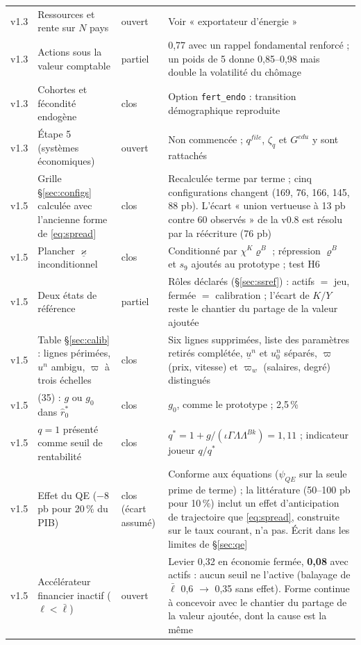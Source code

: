 \documentclass[11pt,a4paper]{article}
\begin{document}
\begin{center}
\begin{longtable}{p{0.9cm}p{4.6cm}p{1.3cm}p{7.6cm}}
v1.3 & Ressources et rente sur $N$ pays & ouvert & Voir « exportateur d'énergie »\\
v1.3 & Actions sous la valeur comptable & partiel & 0,77 avec un rappel fondamental renforcé ; un poids de 5 donne 0,85--0,98 mais double la volatilité du chômage\\
v1.3 & Cohortes et fécondité endogène & clos & Option \texttt{fert\_endo} : transition démographique reproduite\\
v1.3 & Étape 5 (systèmes économiques) & ouvert & Non commencée ; $q^{file}$, $\zeta_q$ et $G^{edu}$ y sont rattachés\\
v1.5 & Grille \S\ref{sec:configs} calculée avec l'ancienne forme de \eqref{eq:spread} & clos & Recalculée terme par terme ; cinq configurations changent (169, 76, 166, 145, 88 pb). L'écart « union vertueuse à 13 pb contre 60 observés » de la v0.8 est résolu par la réécriture (76 pb)\\
v1.5 & Plancher $\underline\varkappa$ inconditionnel & clos & Conditionné par $\chi^K\varrho^B$ ; répression $\varrho^B$ et $s_9$ ajoutés au prototype ; test H6\\
v1.5 & Deux états de référence & partiel & Rôles déclarés (\S\ref{sec:ssref}) : actifs $=$ jeu, fermée $=$ calibration ; l'écart de $K/Y$ reste le chantier du partage de la valeur ajoutée\\
v1.5 & Table \S\ref{sec:calib} : lignes périmées, $u^n$ ambigu, $\varpi$ à trois échelles & clos & Six lignes supprimées, liste des paramètres retirés complétée, $\underline u^n$ et $u^n_0$ séparés, $\varpi$ (prix, vitesse) et $\varpi_w$ (salaires, degré) distingués\\
v1.5 & (35) : $g$ ou $g_0$ dans $\hat r^\ast_0$ & clos & $g_0$, comme le prototype ; 2,5\,\%\\
v1.5 & $q=1$ présenté comme seuil de rentabilité & clos & $q^\ast=1+g/(\iota\Gamma\Lambda\Lambda^{Bk})=1{,}11$ ; indicateur joueur $q/q^\ast$\\
v1.5 & Effet du QE ($-8$ pb pour 20\,\% du PIB) & clos (écart assumé) & Conforme aux équations ($\psi_{QE}$ sur la seule prime de terme) ; la littérature (50--100 pb pour 10\,\%) inclut un effet d'anticipation de trajectoire que \eqref{eq:spread}, construite sur le taux courant, n'a pas. Écrit dans les limites de \S\ref{sec:qe}\\
v1.5 & Accélérateur financier inactif ($\ell<\bar\ell$) & ouvert & Levier 0,32 en économie fermée, \textbf{0,08} avec actifs : aucun seuil ne l'active (balayage de $\bar\ell$ 0,6 $\to$ 0,35 sans effet). Forme continue à concevoir avec le chantier du partage de la valeur ajoutée, dont la cause est la même\\

\end{longtable}
\end{center}
\end{document}
